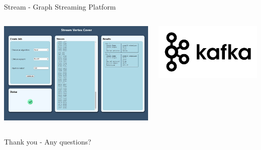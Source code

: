 \documentclass{beamer}
\begin{document}
\begin{frame}{\alert{Stream} - Graph Streaming Platform}
    \begin{columns}
        \begin{column}{0.7\textwidth}
            \includegraphics[width=\textwidth]{stream_crop.jpg}
        \end{column}
        \begin{column}{0.3\textwidth}
            \includegraphics[width=\textwidth]{kafka.png}
        \end{column}
    \end{columns}
\end{frame}

\begin{frame}[standout]
    Thank you - Any questions?
\end{frame}
\end{document}
